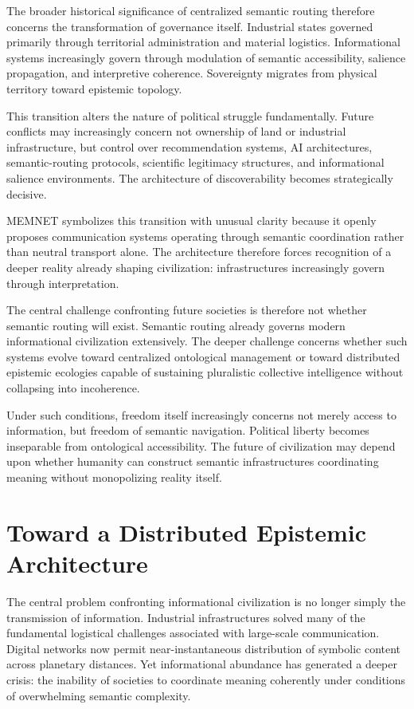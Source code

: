 \documentclass[11pt,a4paper]{article}
\begin{document}
The broader historical significance of centralized semantic routing therefore concerns the transformation of governance itself. Industrial states governed primarily through territorial administration and material logistics. Informational systems increasingly govern through modulation of semantic accessibility, salience propagation, and interpretive coherence. Sovereignty migrates from physical territory toward epistemic topology.

This transition alters the nature of political struggle fundamentally. Future conflicts may increasingly concern not ownership of land or industrial infrastructure, but control over recommendation systems, AI architectures, semantic-routing protocols, scientific legitimacy structures, and informational salience environments. The architecture of discoverability becomes strategically decisive.

MEMNET symbolizes this transition with unusual clarity because it openly proposes communication systems operating through semantic coordination rather than neutral transport alone. The architecture therefore forces recognition of a deeper reality already shaping civilization: infrastructures increasingly govern through interpretation.

The central challenge confronting future societies is therefore not whether semantic routing will exist. Semantic routing already governs modern informational civilization extensively. The deeper challenge concerns whether such systems evolve toward centralized ontological management or toward distributed epistemic ecologies capable of sustaining pluralistic collective intelligence without collapsing into incoherence.

Under such conditions, freedom itself increasingly concerns not merely access to information, but freedom of semantic navigation. Political liberty becomes inseparable from ontological accessibility. The future of civilization may depend upon whether humanity can construct semantic infrastructures coordinating meaning without monopolizing reality itself.

\section{Toward a Distributed Epistemic Architecture}

The central problem confronting informational civilization is no longer simply the transmission of information. Industrial infrastructures solved many of the fundamental logistical challenges associated with large-scale communication. Digital networks now permit near-instantaneous distribution of symbolic content across planetary distances. Yet informational abundance has generated a deeper crisis: the inability of societies to coordinate meaning coherently under conditions of overwhelming semantic complexity.
\end{document}
